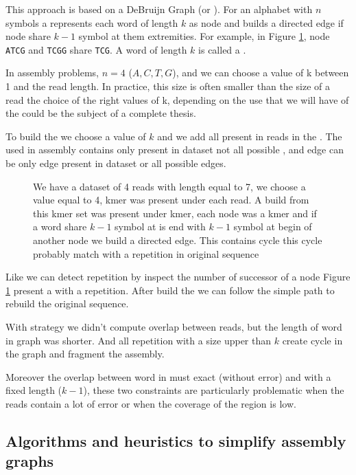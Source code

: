 \documentclass[./main.tex]{subfiles}
\begin{document}
This approach is based on a DeBruijn Graph (or \DBG). For an alphabet with $n$ symbols a \DBG represents each word of length $k$ as node and builds a directed edge if node share $k - 1$ symbol at them extremities. For example, in Figure \ref{intro:fig:dbg:graph}, node \texttt{ATCG} and \texttt{TCGG} share \texttt{TCG}. A word of length $k$ is called a \kmer.

In assembly problems, $n = 4$ (${A, C, T, G}$), and we can choose a value of k between 1 and the read length. In practice, this size is often smaller than the size of a read the choice of the right values of k, depending on the use that we will have of the \DBG could be the subject of a complete thesis.

To build the \DBG we choose a value of $k$ and we add all \kmer present in reads in the \DBG. The \DBG used in assembly contains only \kmer present in dataset not all possible \kmer, and edge can be only edge present in dataset or all possible edges.

\begin{figure}[ht]
    \center
    
    \caption{We have a dataset of 4 reads with length equal to 7, we choose a value equal to 4, kmer was present under each read. A \DBG build from this kmer set was present under kmer, each node was a kmer and if a word share $k - 1$ symbol at is end with $k - 1$ symbol at begin of another node we build a directed edge. This \DBG contains cycle this cycle probably match with a repetition in original sequence}
    \label{intro:fig:dbg:graph}
\end{figure}

Like \OLC we can detect repetition by inspect the number of successor of a node Figure \ref{intro:fig:dbg:graph} present a \DBG with a repetition. After build the \DBG we can follow the simple path to rebuild the original sequence.

With \DBG strategy we didn't compute overlap between reads, but the length of word in graph was shorter. And all repetition with a size upper than $k$ create cycle in the graph and fragment the assembly.

Moreover the overlap between word in \DBG must exact (without error) and with a fixed length ($k - 1$), these two constraints are particularly problematic when the reads contain a lot of error or when the coverage of the region is low.

\subsection{Algorithms and heuristics to simplify assembly graphs}
\end{document}
